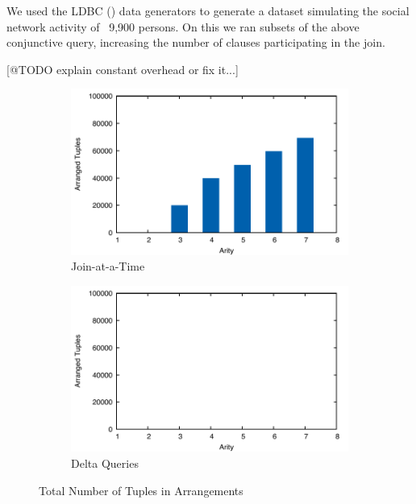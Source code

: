 \documentclass[../catalog.tex]{subfiles}
\begin{document}
We used the LDBC (\cite{erling2015ldbc}) data generators to generate a
dataset simulating the social network activity of ~9,900 persons. On
this we ran subsets of the above conjunctive query, increasing the
number of clauses participating in the join.

[@TODO explain constant overhead or fix it...]

\begin{figure}[h!]
  \begin{subfigure}{1.0\textwidth}
    \includegraphics[width=1.0\linewidth]{results/join-state/out/tuples_join}
    \caption{Join-at-a-Time}
  \end{subfigure}
  \begin{subfigure}{1.0\textwidth}
    \includegraphics[width=1.0\linewidth]{results/join-state/out/tuples_delta}
    \caption{Delta Queries}
  \end{subfigure}

  \caption{Total Number of Tuples in Arrangements}
  \label{fig:tuple-counts}
\end{figure}
\end{document}
